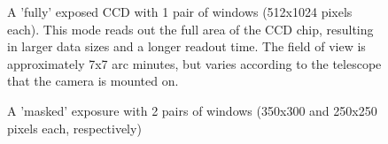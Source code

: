 \begin{figure}
  \centering
  \setlength{\fboxsep}{0pt}
  \setlength{\fboxrule}{1pt}
  \caption{A 'fully' exposed CCD with 1 pair of windows (512x1024 pixels each).  This mode reads out the full area of the CCD chip, resulting in larger data sizes and a longer readout time. The field of view is approximately 7x7 arc minutes, but varies according to the telescope that the camera is mounted on.}
  \label{fig:KOI-824}
\end{figure}

\begin{figure}  
  \centering
  \setlength{\fboxsep}{0pt}
  \setlength{\fboxrule}{1pt}
  \caption{A 'masked' exposure with 2 pairs of windows (350x300 and 250x250 pixels each, respectively)}
  \label{fig:V713Cep}
\end{figure}

